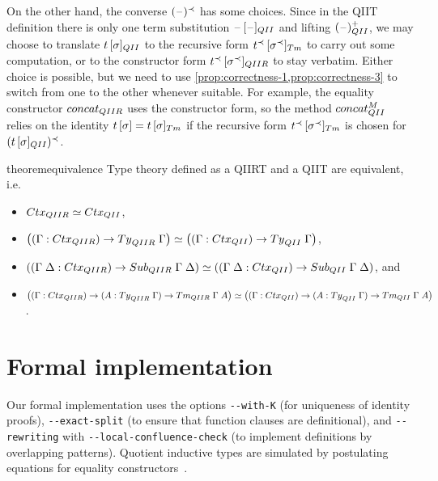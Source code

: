 \documentclass[a4paper,UKenglish,numberwithinsect,cleveref,thm-restate]{lipics-v2021}
\begin{document}
On the other hand, the converse $(\mathord{\hspace{1pt}\text{--}\hspace{1pt}})^{\prec}$ has some choices.
Since in the QIIT definition there is only one term substitution $\sub{\blank}{\blank}_{\I}$ and lifting $(\blank)^+_{\I}$, we may choose to translate $\sub{t}{\sigma}_{\I}$ to the recursive form $\subTm{t^{\prec}}{\sigma^{\prec}}$ to carry out some computation, or to the constructor form $\sub{t^{\prec}}{\sigma^{\prec}}_{\IR}$ to stay verbatim.
Either choice is possible, but we need to use \cref{prop:correctness-1,prop:correctness-3} to switch from one to the other whenever suitable.
For example, the equality constructor $\mathsf{concat}_{\IR}$ uses the constructor form, so the method $\mathsf{concat}^M_{\I}$ relies on the identity $\sub{t}{\sigma} = \subTm{t}{\sigma}$ if the recursive form $\subTm{t^{\prec}}{\sigma^{\prec}}$ is chosen for $(\sub{t}{\sigma}_{\I})^{\prec}$.
%
%
\begin{restatable}{theorem}{equivalence}\label{thm:equivalence}
  Type theory defined as a QIIRT and a QIIT are equivalent, i.e.\ 
  \begin{itemize}
    \item $\eqv{\Ctx_{\IR}}{\Ctx_{\I}}$, 
    \item $\eqv{\left((\Gamma : \Ctx_{\IR})\to\Ty_{\IR}\;\Gamma\right)}{\left((\Gamma : \Ctx_{\I})\to\Ty_{\I}\;\Gamma\right)}$,
    \item $\eqv{\left((\Gamma\;\Delta : \Ctx_{\IR}) \to \Sub_{\IR}\;\Gamma\;\Delta\right)}%
               {\left((\Gamma\;\Delta: \Ctx_{\I}) \to \Sub_{\I}\;\Gamma\;\Delta\right)}$, and 
    \item $\eqv{\left((\Gamma : \Ctx_{\IR}) \to (A : \Ty_{\IR}\;\Gamma) \to \Tm_{\IR}\;\Gamma\;A\right)}
               {\left((\Gamma : \Ctx_{\I}) \to (A : \Ty_{\I}\;\Gamma) \to \Tm_{\I}\;\Gamma\;A\right)}$.
  \end{itemize}
\end{restatable}

\section{Formal implementation} \label{sec:formal-implementation}

Our formal \Agda implementation uses the options \texttt{-{}-with-K} (for uniqueness of identity proofs), \texttt{-{}-exact-split} (to ensure that function clauses are definitional), and \texttt{-{}-rewriting} with \texttt{-{}-local-confluence-check} \cite{Cockx2020,Cockx2021} (to implement definitions by overlapping patterns).
Quotient inductive types are simulated by postulating equations for equality constructors~\cite{Licata2011}. %
\end{document}
